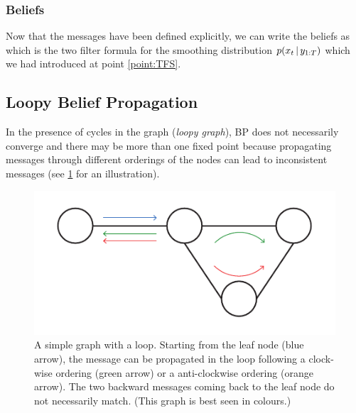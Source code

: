 \subsubsection{Beliefs}
Now that the messages have been defined explicitly, we can write the beliefs as
%
%
which is the two filter formula for the smoothing distribution $p(x_{t}\,|\, y_{1:T})$ which we had introduced at point \ref{point:TFS}.

\subsection{\label{point:LBP}Loopy Belief Propagation}

In the presence of cycles in the graph (\emph{loopy graph}), BP does not necessarily converge and there may be more than one fixed point because propagating messages through different orderings of the nodes can lead to inconsistent messages (see \ref{fig:lbp-inconsistent} for an illustration).
 
\begin{figure}[!h]
\center
\includegraphics[width=.7\textwidth]{figures/lbp/loopy1}
\caption{\label{fig:lbp-inconsistent}A simple graph with a loop. Starting from the leaf node (blue arrow), the message can be propagated in the loop following a clock-wise ordering (green arrow) or a anti-clockwise ordering (orange arrow). The two backward messages coming back to the leaf node do not necessarily match. (This graph is best seen in colours.)}
\end{figure}

